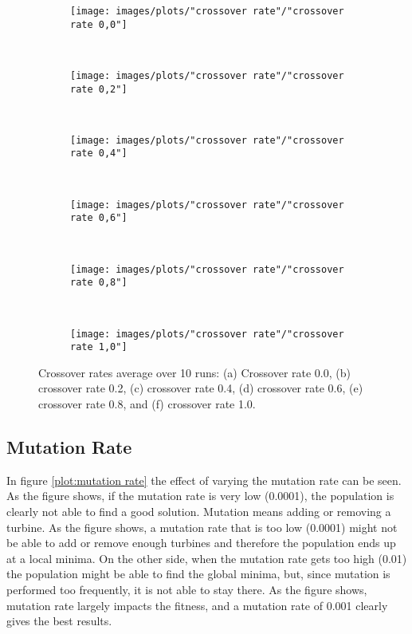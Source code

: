\begin{figure}[h!]
    \centering
    \begin{subfigure}[b]{0.31\textwidth}
        \texttt{[image: images/plots/"crossover rate"/"crossover rate 0,0"]}
        \caption{}
        \hfill
        \label{plot:crossover rate 0.0}
    \end{subfigure}
    ~
    \begin{subfigure}[b]{0.31\textwidth}
        \texttt{[image: images/plots/"crossover rate"/"crossover rate 0,2"]}
        \caption{}
        \hfill
        \label{plot:crossover rate 0.2}
    \end{subfigure}
    ~
       \begin{subfigure}[b]{0.31\textwidth}
        \texttt{[image: images/plots/"crossover rate"/"crossover rate 0,4"]}
        \caption{}
        \hfill
        \label{plot:crossover rate 0.4}
    \end{subfigure}
    ~
       \begin{subfigure}[b]{0.31\textwidth}
        \texttt{[image: images/plots/"crossover rate"/"crossover rate 0,6"]}
        \caption{}
        \hfill
        \label{plot:crossover rate 0.6}
    \end{subfigure}
    ~
       \begin{subfigure}[b]{0.31\textwidth}
        \texttt{[image: images/plots/"crossover rate"/"crossover rate 0,8"]}
        \caption{}
        \hfill
        \label{plot:crossover rate 0.8r}
    \end{subfigure}
    ~
    \begin{subfigure}[b]{0.31\textwidth}
        \texttt{[image: images/plots/"crossover rate"/"crossover rate 1,0"]}
        \caption{}
        \hfill
        \label{plot:crossover rate 1.0}
    \end{subfigure}
    \caption{Crossover rates average over 10 runs: (a) Crossover rate 0.0, (b) crossover rate 0.2, (c) crossover rate 0.4, (d) crossover rate 0.6, (e) crossover rate 0.8, and (f) crossover rate 1.0.}
    \label{plot:crossover rates}
\end{figure}


\subsection{Mutation Rate}
In figure \ref{plot:mutation rate} the effect of varying the mutation rate can be seen. As the figure shows, if the mutation rate is very low (0.0001), the population is clearly not able to find a good solution. Mutation means adding or removing a turbine. As the figure shows, a mutation rate that is too low (0.0001) might not be able to add or remove enough turbines and therefore the population ends up at a local minima. On the other side, when the mutation rate gets too high (0.01) the population might be able to find the global minima, but, since mutation is performed too frequently, it is not able to stay there. As the figure shows, mutation rate largely impacts the fitness, and a mutation rate of 0.001 clearly gives the best results.


